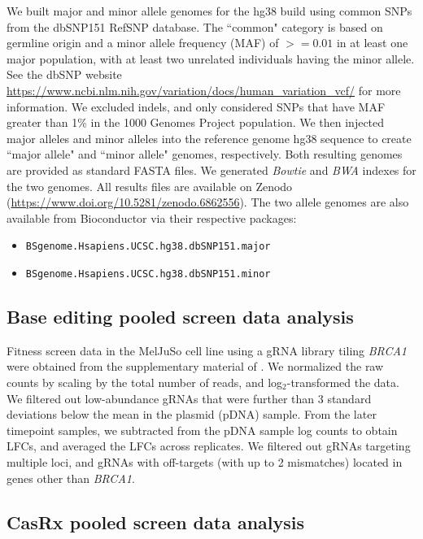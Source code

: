 \documentclass[pdftex,english,10pt]{article}
\begin{document}
{We built major and minor allele genomes for the hg38 build using common SNPs from the dbSNP151 RefSNP database. The ``common" category is based on germline origin and a minor allele frequency (MAF) of $>=0.01$ in at least one major population, with at least two unrelated individuals having the minor allele. See the dbSNP website \url{https://www.ncbi.nlm.nih.gov/variation/docs/human_variation_vcf/} for more information. We excluded indels, and only considered SNPs that have MAF greater than 1\% in the 1000 Genomes Project population. We then injected major alleles and minor alleles into the reference genome hg38 sequence to create ``major allele" and ``minor allele" genomes, respectively. Both resulting genomes are provided as standard FASTA files. We generated \textit{Bowtie} and \textit{BWA} indexes for the two genomes. All results files are available on Zenodo (\url{https://www.doi.org/10.5281/zenodo.6862556}). The two allele genomes are also available from Bioconductor via their respective packages:

\begin{itemize}
\item \texttt{BSgenome.Hsapiens.UCSC.hg38.dbSNP151.major} \citep{bsgenome_major}
\item \texttt{BSgenome.Hsapiens.UCSC.hg38.dbSNP151.minor} \citep{bsgenome_minor}
\end{itemize}


\subsection*{Base editing pooled screen data analysis}

Fitness screen data in the MelJuSo cell line using a gRNA library tiling \textit{BRCA1} were obtained from the supplementary material of \citet{hanna2021massively}. We normalized the raw counts by scaling by the total number of reads, and log$_2$-transformed the data. We filtered out low-abundance gRNAs that were further than 3 standard deviations below the mean in the plasmid (pDNA) sample. From the later timepoint samples, we subtracted from the pDNA sample log counts to obtain LFCs, and averaged the LFCs across replicates. We filtered out gRNAs targeting multiple loci, and gRNAs with off-targets (with up to 2 mismatches) located in genes other than \textit{BRCA1}.  




\subsection*{CasRx pooled screen data analysis}

}
\end{document}
